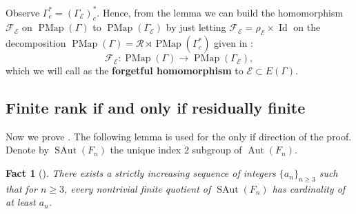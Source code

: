 \documentclass[11pt]{amsart}
\theoremstyle{plain}
\newtheorem{FACT}[THM]{Fact}
\theoremstyle{definition}
\DeclareMathOperator{\Id}{Id}
\DeclareMathOperator{\Aut}{Aut}
\DeclareMathOperator{\SAut}{SAut}
\DeclareMathOperator{\PMap}{PMap}
\newcommand{\cE}{\mathcal{E}}
\newcommand{\cF}{\mathcal{F}}
\newcommand{\cR}{\mathcal{R}}
\def\G{{\Gamma}}
\newcommand{\<}{\langle}
\renewcommand{\>}{\rangle}
\begin{document}
Observe $\G_c^* = (\G_\cE)_c^*$.
Hence, from the lemma we can build the homomorphism $\cF_\cE$ on $\PMap(\G)$ to $\PMap(\G_\cE)$ by just letting $\cF_\cE = \rho_\cE \times \Id$ on the decomposition $\PMap(\G) = \cR \rtimes \PMap(\G_c^*)$ given in :
\[
    \cF_\cE : \PMap(\G) \to \PMap(\G_\cE),
\]
 which we will call as the \textbf{forgetful homomorphism} to $\cE \subset E(\G)$.
 
\subsection{Finite rank if and only if residually finite} \label{ssec:RFiffFIN}
Now we prove .
The following lemma is used for the only if direction of the proof. Denote by $\SAut(F_n)$ the unique index 2 subgroup of $\Aut(F_n)$. 
\begin{FACT}[{\cite[Theorem 9.1]{baumeister2019smallest}}]
 \label{fact:minimalindex}
     There exists a strictly increasing sequence of integers $\{a_n\}_{n \ge 3}$ such that for $n \ge 3$, every nontrivial finite quotient of $\SAut(F_n)$ has cardinality of at least $a_n$. 
 \end{FACT}
\end{document}

